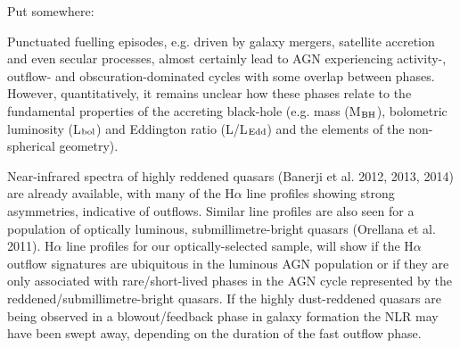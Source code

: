 Put somewhere: 


Punctuated fuelling episodes, e.g. driven by galaxy mergers, satellite accretion and even secular processes,
almost certainly lead to AGN experiencing activity-, outflow- and obscuration-dominated cycles with some overlap between phases. 
However, quantitatively, it remains unclear how these phases relate to the fundamental properties of the accreting black-hole (e.g.  mass (M$_{\rm{BH}}$), bolometric luminosity (L$_{\rm{bol}}$) and Eddington ratio (L/L$_{\rm{Edd}}$) and the elements of the non-spherical geometry).



Near-infrared spectra of highly reddened quasars (Banerji et al. 2012, 2013, 2014) are already available, with many of the H$\alpha$ line profiles showing strong asymmetries, indicative of outflows. 
Similar line profiles are also seen for a population of optically luminous, submillimetre-bright quasars (Orellana et al. 2011). 
H$\alpha$ line profiles for our optically-selected sample, will show if the H$\alpha$ outflow signatures are ubiquitous in the luminous AGN population or if they are only associated with rare/short-lived phases in the AGN cycle represented by the reddened/submillimetre-bright quasars.
If the highly dust-reddened quasars are being observed in a blowout/feedback phase in galaxy formation the NLR may have been swept away, depending on the duration of the fast outflow phase.


